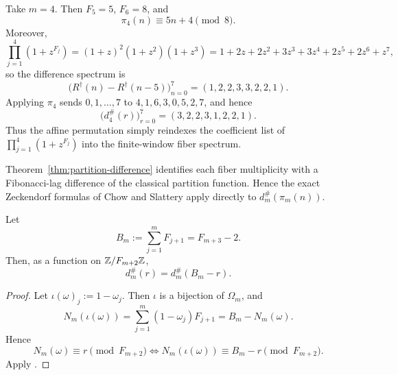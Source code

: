 \begin{example}
\label{ex:m4-partition-difference}
Take \(m=4\).  Then \(F_5=5\), \(F_6=8\), and
\[
  \pi_4(n)\equiv 5n+4 \pmod 8.
\]
Moreover,
\[
  \prod_{j=1}^4(1+z^{F_j})
  =
  (1+z)^2(1+z^2)(1+z^3)
  =
  1+2z+2z^2+3z^3+3z^4+2z^5+2z^6+z^7,
\]
so the difference spectrum is
\[
  \bigl(R^\dagger(n)-R^\dagger(n-5)\bigr)_{n=0}^{7}
  =
  (1,2,2,3,3,2,2,1).
\]
Applying \(\pi_4\) sends \(0,1,\dots,7\) to \(4,1,6,3,0,5,2,7\), and hence
\[
  \bigl(d_4^\#(r)\bigr)_{r=0}^{7}
  =
  (3,2,2,3,1,2,2,1).
\]
Thus the affine permutation simply reindexes the coefficient list of
\(\prod_{j=1}^4(1+z^{F_j})\) into the finite-window fiber spectrum.
\end{example}

\begin{remark}
\label{rem:single-fiber-literature}
Theorem~\ref{thm:partition-difference} identifies each fiber multiplicity with
a Fibonacci-lag difference of the classical partition function.  Hence the
exact Zeckendorf formulas of Chow and Slattery \cite{ChowSlattery2021} apply
directly to \(d_m^\#(\pi_m(n))\).
\end{remark}

\begin{proposition}
\label{prop:complement-symmetry}
Let
\[
  B_m:=\sum_{j=1}^mF_{j+1}=F_{m+3}-2.
\]
Then, as a function on \(\mathbb{Z}/F_{m+2}\mathbb{Z}\),
\[
  d_m^\#(r)=d_m^\#(B_m-r).
\]
\end{proposition}

\begin{proof}
Let \(\iota(\omega)_j:=1-\omega_j\).  Then \(\iota\) is a bijection of
\(\Omega_m\), and
\[
  N_m(\iota(\omega))
  =
  \sum_{j=1}^m (1-\omega_j)F_{j+1}
  =
  B_m-N_m(\omega).
\]
Hence
\[
  N_m(\omega)\equiv r \pmod{F_{m+2}}
  \iff
  N_m(\iota(\omega))\equiv B_m-r \pmod{F_{m+2}}.
\]
Apply .
\end{proof}
